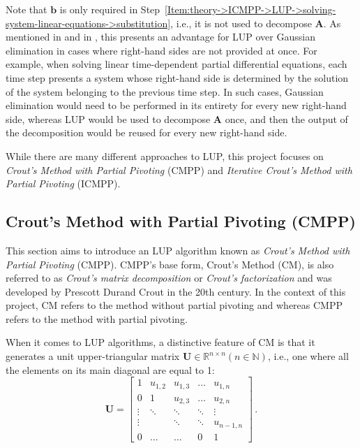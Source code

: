 Note that $\mathbf{b}$ is only required in Step~\ref{Item:theory->ICMPP->LUP->solving-system-linear-equations->substitution}, i.e., it is not used to decompose $\mathbf{A}$.
As mentioned in  \cite{Cejka2022} and in  \cite{Lindfield2019}, this presents an advantage for LUP over Gaussian elimination in cases where right-hand sides are not provided at once.
For example, when solving linear time-dependent partial differential equations, each time step presents a system whose right-hand side is determined by the solution of the system belonging to the previous time step.
In such cases, Gaussian elimination would need to be performed in its entirety for every new right-hand side, whereas LUP would be used to decompose $\mathbf{A}$ once, and then the output of the decomposition would be reused for every new right-hand side.

While there are many different approaches to LUP, this project focuses on \textit{Crout's Method with Partial Pivoting} (CMPP) and \textit{Iterative Crout's Method with Partial Pivoting} (ICMPP).



\subsection{Crout's Method with Partial Pivoting (CMPP)}\label{Subsection:theory->ICMPP->LUP->CMPP}
This section aims to introduce an LUP algorithm known as \textit{Crout's Method with Partial Pivoting} (CMPP).
CMPP's base form, Crout's Method (CM), is also referred to as \textit{Crout's matrix decomposition} or \textit{Crout's factorization} and was developed by Prescott Durand Crout \cite{Press2007} in the 20th century.
In the context of this project, CM refers to the method without partial pivoting and whereas CMPP refers to the method with partial pivoting.

When it comes to LUP algorithms, a distinctive feature of CM is that it generates a unit upper-triangular matrix $\mathbf{U} \in \mathbb{R}^{n \times n} \left(n \in \mathbb{N}\right)$, i.e., one where all the elements on its main diagonal are equal to 1:
\begin{equation}
	\mathbf{U} = {
		\begin{bmatrix}
			1		 & u _{1,2} & u _{1,3} & \ldots & u _{1,n}   \\
			0 		 & 1		& u _{2,3} & \ldots & u _{2,n}   \\
			\vdots   & \ddots 	& \ddots   & \ddots & \vdots 	 \\
			\vdots   & 			& \ddots   & \ddots & u _{n-1,n} \\
			0 		 & \ldots	& \ldots   & 0 		& 1
		\end{bmatrix}
	} \,.
\end{equation}

